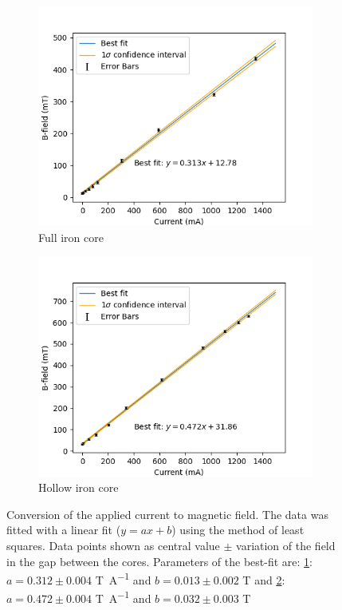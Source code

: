 \documentclass[11pt]{article}
\begin{document}
\begin{figure}[h!]
  \centering
  \begin{subfigure}{0.48\linewidth}
    \includegraphics[width=\linewidth]{IvsB full.png}
    \caption{Full iron core}
    \label{fig:IvsB full}
  \end{subfigure}
  \hfill
  \begin{subfigure}{0.48\linewidth}
    \includegraphics[width=\linewidth]{IvsB hollow.png}
    \caption{Hollow iron core}
    \label{fig:IvsB hollow}
  \end{subfigure}
  \captionsetup{justification=centering}
  \caption{Conversion of the applied current to magnetic field.  The data was fitted with a linear fit ($y = a x + b$) using the method of least squares. Data points shown as central value $\pm$ variation of the field in the gap between the cores. Parameters of the best-fit are: \ref{fig:IvsB full}: $a = 0.312 \pm 0.004 $ \si{T.A^{-1}} and $ b = 0.013 \pm 0.002 $ \si{T} and \ref{fig:IvsB hollow}: $a = 0.472 \pm 0.004 $ \si{T.A^{-1}} and $ b = 0.032 \pm 0.003 $ \si{T}}
  \label{fig:IvsB}
\end{figure}
\end{document}
